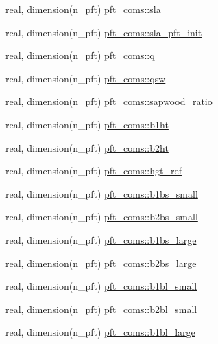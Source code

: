 \begin{DoxyCompactItemize}
\item 
real, dimension(n\+\_\+pft) \hyperlink{namespacepft__coms_ad1aabb01620d2b7320709e93cfe784f8}{pft\+\_\+coms\+::sla}
\item 
real, dimension(n\+\_\+pft) \hyperlink{namespacepft__coms_a535eacb23669b894d3f37596a40673e2}{pft\+\_\+coms\+::sla\+\_\+pft\+\_\+init}
\item 
real, dimension(n\+\_\+pft) \hyperlink{namespacepft__coms_a94feb354a8416167ef0ff2690843ebcd}{pft\+\_\+coms\+::q}
\item 
real, dimension(n\+\_\+pft) \hyperlink{namespacepft__coms_a646ad26118949294d5b8007435e7d33d}{pft\+\_\+coms\+::qsw}
\item 
real, dimension(n\+\_\+pft) \hyperlink{namespacepft__coms_ad00617b976d68174e6d5fb6227be9d90}{pft\+\_\+coms\+::sapwood\+\_\+ratio}
\item 
real, dimension(n\+\_\+pft) \hyperlink{namespacepft__coms_a00f748893c4f7254524515d560a16eee}{pft\+\_\+coms\+::b1ht}
\item 
real, dimension(n\+\_\+pft) \hyperlink{namespacepft__coms_a5c7b374e94930d3266444e1ef0539447}{pft\+\_\+coms\+::b2ht}
\item 
real, dimension(n\+\_\+pft) \hyperlink{namespacepft__coms_a8cc0c7c9a26d749fd17c1ddc8633ea8a}{pft\+\_\+coms\+::hgt\+\_\+ref}
\item 
real, dimension(n\+\_\+pft) \hyperlink{namespacepft__coms_a9a7ea1fec116893e64d9d8ace1c14e0c}{pft\+\_\+coms\+::b1bs\+\_\+small}
\item 
real, dimension(n\+\_\+pft) \hyperlink{namespacepft__coms_a184732d6139803d34ee55b42fb921695}{pft\+\_\+coms\+::b2bs\+\_\+small}
\item 
real, dimension(n\+\_\+pft) \hyperlink{namespacepft__coms_a5a61d97876e834a3e2618c85a2310bba}{pft\+\_\+coms\+::b1bs\+\_\+large}
\item 
real, dimension(n\+\_\+pft) \hyperlink{namespacepft__coms_aed3d2b057ee3fbf66a115868344eaa33}{pft\+\_\+coms\+::b2bs\+\_\+large}
\item 
real, dimension(n\+\_\+pft) \hyperlink{namespacepft__coms_acec323ee151ee47b0173bc85ef816453}{pft\+\_\+coms\+::b1bl\+\_\+small}
\item 
real, dimension(n\+\_\+pft) \hyperlink{namespacepft__coms_ab0d33f3125e1ddd008763f955beceb8d}{pft\+\_\+coms\+::b2bl\+\_\+small}
\item 
real, dimension(n\+\_\+pft) \hyperlink{namespacepft__coms_a214f419aed39937155b3b0e22ef55437}{pft\+\_\+coms\+::b1bl\+\_\+large}
\item 

\end{DoxyCompactItemize}
